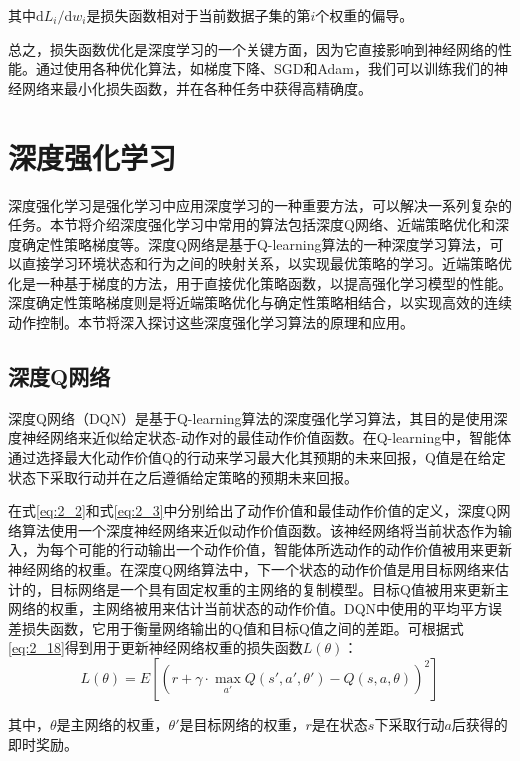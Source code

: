 其中$\mathrm{d}{L_i} / \mathrm{d}{w_i}$是损失函数相对于当前数据子集的第$i$个权重的偏导。

总之，损失函数优化是深度学习的一个关键方面，因为它直接影响到神经网络的性能。通过使用各种优化算法，如梯度下降、SGD和Adam，我们可以训练我们的神经网络来最小化损失函数，并在各种任务中获得高精确度。


\section{深度强化学习}
\label{section:2.3}

深度强化学习是强化学习中应用深度学习的一种重要方法，可以解决一系列复杂的任务。本节将介绍深度强化学习中常用的算法包括深度Q网络、近端策略优化和深度确定性策略梯度等。深度Q网络是基于Q-learning算法的一种深度学习算法，可以直接学习环境状态和行为之间的映射关系，以实现最优策略的学习。近端策略优化是一种基于梯度的方法，用于直接优化策略函数，以提高强化学习模型的性能。深度确定性策略梯度则是将近端策略优化与确定性策略相结合，以实现高效的连续动作控制。本节将深入探讨这些深度强化学习算法的原理和应用。

\subsection{深度Q网络}

深度Q网络（DQN）是基于Q-learning算法的深度强化学习算法，其目的是使用深度神经网络来近似给定状态-动作对的最佳动作价值函数。在Q-learning中，智能体通过选择最大化动作价值Q的行动来学习最大化其预期的未来回报，Q值是在给定状态下采取行动并在之后遵循给定策略的预期未来回报。

在式\ref{eq:2_2}和式\ref{eq:2_3}中分别给出了动作价值和最佳动作价值的定义，深度Q网络算法使用一个深度神经网络来近似动作价值函数。该神经网络将当前状态作为输入，为每个可能的行动输出一个动作价值，智能体所选动作的动作价值被用来更新神经网络的权重。在深度Q网络算法中，下一个状态的动作价值是用目标网络来估计的，目标网络是一个具有固定权重的主网络的复制模型。目标Q值被用来更新主网络的权重，主网络被用来估计当前状态的动作价值。DQN中使用的平均平方误差损失函数，它用于衡量网络输出的Q值和目标Q值之间的差距。可根据式\ref{eq:2_18}得到用于更新神经网络权重的损失函数$L(\theta)$：
\begin{equation}
\label{eq:2_22}
L(\theta) = E\left[\left(r + \gamma \cdot \max _{a'} Q(s', a', \theta') - Q(s, a, \theta)\right)^2\right ]
\end{equation}


其中，$\theta$是主网络的权重，$\theta '$是目标网络的权重，$r$是在状态$s$下采取行动$a$后获得的即时奖励。

